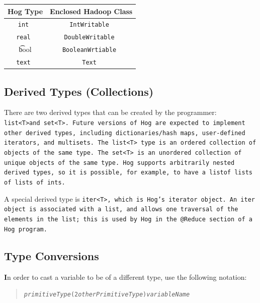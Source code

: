 \documentclass{book}
\begin{document}
\begin{center}
\begin{tabular}{|c|c|}
    \hline
\textbf{Hog Type} & \textbf{Enclosed Hadoop Class} \\ \hline
\tt int & \tt IntWritable \\ \hline
\tt real & \tt DoubleWritable \\ \hline
\t bool & \tt BooleanWrtiable \\ \hline
\tt text & \tt Text \rm \\ \hline
\end{tabular}
\end{center}


\subsection{Derived Types (Collections)} %
\label{sub:derived_types_collections_}

There are two derived types that can be created by the programmer: \tt
list<T>\rm and \tt set<T>\rm.  Future versions of Hog are expected to implement
other derived types, including dictionaries/hash maps, user-defined iterators,
and multisets. The \tt list<T> \rm type is an ordered collection of objects of
the same type. The \tt set<T> \rm is an unordered collection of unique objects
of the same type. Hog supports arbitrarily nested derived types, so it is
possible, for example, to have a \tt list\rm  of \tt list\rm s of \tt list\rm s
of \tt int\rm s.

A special derived type is \tt iter<T>\rm, which is Hog's iterator object. An
\tt iter \rm object is associated with a list, and allows one traversal of the
elements in the list; this is used by Hog in the \tt @Reduce \rm section of a
Hog program.


\subsection{Type Conversions} %
\label{sub:conversions}

\textbf In order to cast a variable to be of a different type, use the
following notation:

\begin{quotation}
      \tt \emph{primitiveType}(2\emph{otherPrimitiveType})\rm \emph{variableName}
\end{quotation}
\end{document}
